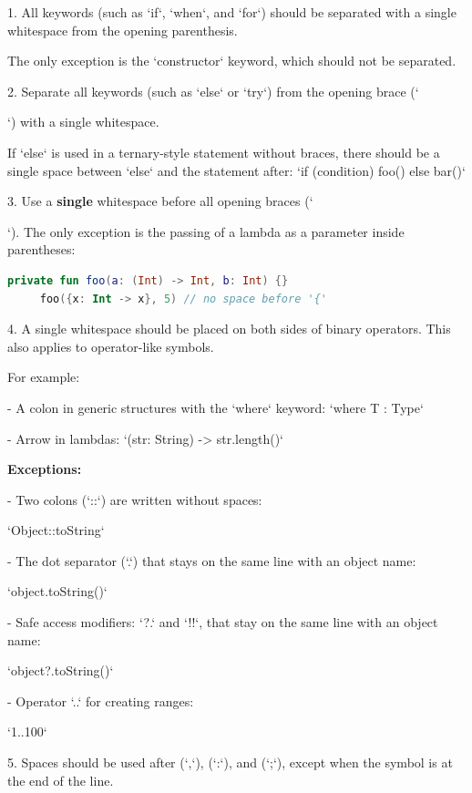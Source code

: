 {{1.  All keywords (such as `if`, `when`, and `for`) should be separated with a single whitespace from the opening parenthesis.

    The only exception is the `constructor` keyword, which should not be separated.



2.  Separate all keywords (such as `else` or `try`) from the opening brace (`{`) with a single whitespace.

    If `else` is used in a ternary-style statement without braces, there should be a single space between `else` and the statement after: `if (condition) foo() else bar()`



3.  Use a \textbf{single} whitespace before all opening braces (`{`). The only exception is the passing of a lambda as a parameter inside parentheses:

\begin{lstlisting}[language=Kotlin]
     private fun foo(a: (Int) -> Int, b: Int) {}
     foo({x: Int -> x}, 5) // no space before '{'
\end{lstlisting}


4.  A single whitespace should be placed on both sides of binary operators. This also applies to operator-like symbols.

    For example: 

    

 - A colon in generic structures with the `where` keyword:  `where T : Type`

 - Arrow in lambdas: `(str: String) -> str.length()`



\textbf{Exceptions:}



- Two colons (`::`) are written without spaces:\

  `Object::toString`

- The dot separator (`.`) that stays on the same line with an object name:\

  `object.toString()`

- Safe access modifiers: `?.` and `!!`, that stay on the same line with an object name:\

  `object?.toString()`

- Operator `..` for creating ranges:\

  `1..100`



5.  Spaces should be used after (`,`), (`:`), and (`;`), except when the symbol is at the end of the line.

}}}}
